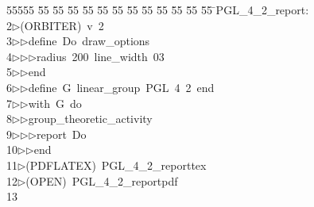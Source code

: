 %
%
\begin{tabbing}
55555 \= 55 \= 55 \= 55 \= 55 \= 55 \= 55 \= 55 \= 55 \= 55 \= 55 \= 55 \= 55 \= \>PGL\_4\_2\_report:\\[0pt]
2\>$\triangleright$\>(ORBITER)\ v\ 2\ \\[0pt]
3\>$\triangleright$\>$\triangleright$\>define\ Do\ draw\_options\ \\[0pt]
4\>$\triangleright$\>$\triangleright$\>$\triangleright$\>radius\ 200\ line\_width\ 03\ \\[0pt]
5\>$\triangleright$\>$\triangleright$\>end\ \\[0pt]
6\>$\triangleright$\>$\triangleright$\>define\ G\ linear\_group\ PGL\ 4\ 2\ end\ \\[0pt]
7\>$\triangleright$\>$\triangleright$\>with\ G\ do\ \\[0pt]
8\>$\triangleright$\>$\triangleright$\>group\_theoretic\_activity\ \\[0pt]
9\>$\triangleright$\>$\triangleright$\>$\triangleright$\>report\ Do\ \\[0pt]
10\>$\triangleright$\>$\triangleright$\>end\\[0pt]
11\>$\triangleright$\>(PDFLATEX)\ PGL\_4\_2\_reporttex\\[0pt]
12\>$\triangleright$\>(OPEN)\ PGL\_4\_2\_reportpdf\\[0pt]
13\>\end{tabbing}
